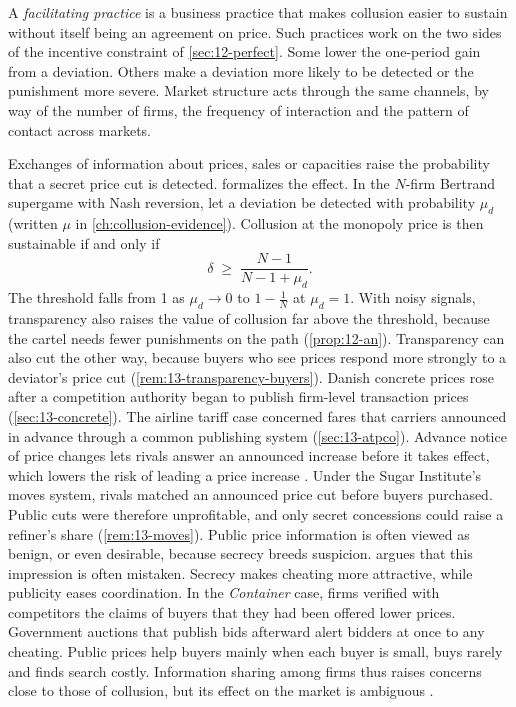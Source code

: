 A \emph{facilitating practice} is a business practice that makes collusion easier to sustain without itself being
an agreement on price. Such practices work on the two sides of the incentive constraint of \cref{sec:12-perfect}.
Some lower the one-period gain from a deviation. Others make a deviation more likely to be detected or the
punishment more severe. Market structure acts through the same channels, by way of the number of firms, the
frequency of interaction and the pattern of contact across markets.

Exchanges of information about prices, sales or capacities raise the probability that a secret price cut is
detected.  formalizes the effect. In the $N$-firm Bertrand supergame with Nash
reversion, let a deviation be detected with probability $\mu_d$ (written $\mu$ in \cref{ch:collusion-evidence}).
Collusion at the monopoly price is then sustainable if and only if
\begin{equation}\label{eq:12-transparency-recap}
  \delta \;\ge\; \frac{N-1}{N-1+\mu_d} .
\end{equation}
The threshold falls from 1 as $\mu_d \to 0$ to $1 - \frac{1}{N}$ at $\mu_d = 1$. With noisy signals, transparency also
raises the value of collusion far above the threshold, because the cartel needs fewer punishments on the path
(\cref{prop:12-an}). Transparency can also cut the other way, because buyers who see prices respond more strongly to
a deviator's price cut (\cref{rem:13-transparency-buyers}). Danish concrete prices rose after a competition authority began to publish
firm-level transaction prices (\cref{sec:13-concrete}). The airline tariff case concerned fares that carriers
announced in advance through a common publishing system (\cref{sec:13-atpco}). Advance notice of price changes
lets rivals answer an announced increase before it takes effect, which lowers the risk of leading a price increase
\citep[pp.~187 and~193]{HoltScheffman1987}. Under the Sugar Institute's moves system, rivals matched an announced price cut before
buyers purchased. Public cuts were therefore unprofitable, and only secret concessions could raise a refiner's
share (\cref{rem:13-moves}).
Public price information is often viewed as benign, or even desirable, because secrecy breeds suspicion.
\citet[pp.~202--203, note~56]{Kaplow2013} argues that this impression is often mistaken. Secrecy makes cheating more
attractive, while publicity eases coordination. In the \textit{Container} case, firms verified with competitors the
claims of buyers that they had been offered lower prices. Government auctions that publish bids afterward alert
bidders at once to any cheating. Public prices help buyers mainly when each buyer is small, buys rarely and finds
search costly. Information sharing among firms thus raises concerns close to those of collusion, but its effect on
the market is ambiguous \citep[p.~189, note~26]{AskerNocke2021}.

